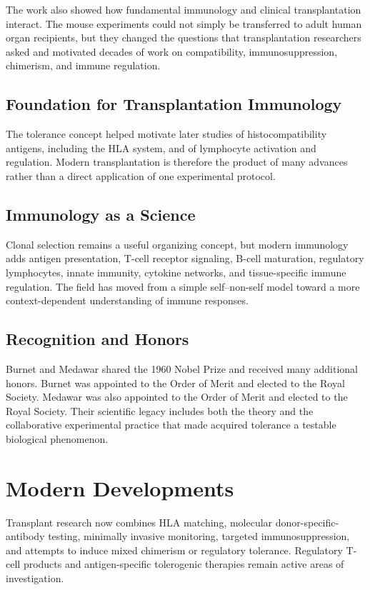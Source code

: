 The work also showed how fundamental immunology and clinical transplantation interact. The mouse experiments could not simply be transferred to adult human organ recipients, but they changed the questions that transplantation researchers asked and motivated decades of work on compatibility, immunosuppression, chimerism, and immune regulation.

\subsection{Foundation for Transplantation Immunology}

The tolerance concept helped motivate later studies of histocompatibility antigens, including the HLA system, and of lymphocyte activation and regulation. Modern transplantation is therefore the product of many advances rather than a direct application of one experimental protocol.

\subsection{Immunology as a Science}

Clonal selection remains a useful organizing concept, but modern immunology adds antigen presentation, T-cell receptor signaling, B-cell maturation, regulatory lymphocytes, innate immunity, cytokine networks, and tissue-specific immune regulation. The field has moved from a simple self--non-self model toward a more context-dependent understanding of immune responses.

\subsection{Recognition and Honors}

Burnet and Medawar shared the 1960 Nobel Prize and received many additional honors. Burnet was appointed to the Order of Merit and elected to the Royal Society. Medawar was also appointed to the Order of Merit and elected to the Royal Society. Their scientific legacy includes both the theory and the collaborative experimental practice that made acquired tolerance a testable biological phenomenon.

\section{Modern Developments}

Transplant research now combines HLA matching, molecular donor-specific-antibody testing, minimally invasive monitoring, targeted immunosuppression, and attempts to induce mixed chimerism or regulatory tolerance. Regulatory T-cell products and antigen-specific tolerogenic therapies remain active areas of investigation.

